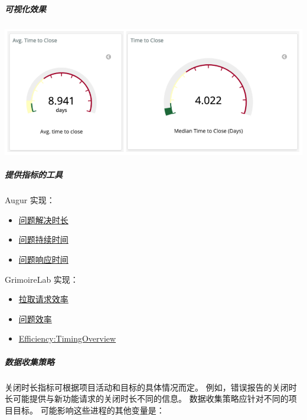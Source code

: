 \hypertarget{ux53efux89c6ux5316ux6548ux679c}{%
\subparagraph{可视化效果}\label{ux53efux89c6ux5316ux6548ux679c}}

\includegraphics{images/time-to-close_1.png}

\hypertarget{ux63d0ux4f9bux6307ux6807ux7684ux5de5ux5177}{%
\subparagraph{提供指标的工具}\label{ux63d0ux4f9bux6307ux6807ux7684ux5de5ux5177}}

Augur 实现：

\begin{itemize}
\tightlist
\item
  \href{http://augur.osshealth.io/api_docs/\#api-Evolution-Closed_Issue_Resolution_Duration(Repo)}{问题解决时长}
\item
  \href{http://augur.osshealth.io/api_docs/\#api-Evolution-issue-duration-repo}{问题持续时间}
\item
  \href{http://augur.osshealth.io/api_docs/\#api-Evolution-Issue_Response_Time(Repo)}{问题响应时间}
\end{itemize}

GrimoireLab 实现：

\begin{itemize}
\tightlist
\item
  \href{https://chaoss.github.io/grimoirelab-sigils/panels/github-pullrequests-efficiency/}{拉取请求效率}
\item
  \href{https://chaoss.github.io/grimoirelab-sigils/panels/github-issues-efficiency/}{问题效率}
\item
  \href{https://chaoss.github.io/grimoirelab-sigils/panels/efficiency-timing-overview/}{Efficiency:TimingOverview}
\end{itemize}

\hypertarget{ux6570ux636eux6536ux96c6ux7b56ux7565}{%
\subparagraph{数据收集策略}\label{ux6570ux636eux6536ux96c6ux7b56ux7565}}

关闭时长指标可根据项目活动和目标的具体情况而定。
例如，错误报告的关闭时长可能提供与新功能请求的关闭时长不同的信息。
数据收集策略应针对不同的项目目标。 可能影响这些进程的其他变量是：

